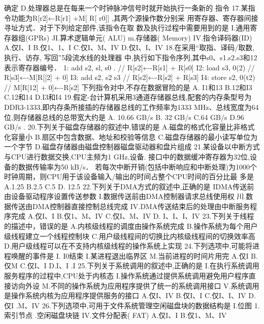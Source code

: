 确定
D.处理器总是在每来一个时钟脉冲信号时就开始执行一条新的
指令
17.某指令功能为R[r2]←R[r1] +M[ R[ r0]] ,其两个源操作数分别采
用寄存器、寄存器间接寻址方式．对于下列给定部件,该指令在取
数及执行过程中需要用到的是
I.通用寄存器组(GPRs)
JI.算术逻辑单元( ALU)
m.存储器( Memory)
IV.指令译码器(ID)
A.仅I、I
B.仅1、1、I
C.仅I、M、IV
D.仅I、I、IV
18.在采用“取指、译码/取数, 执行、访存, 写回”5段流水线的处理器
中,执行如下指令序列,其中s0、s1.s2.s3和12表示寄存器编号．
1: add s2, sl, s0
. // R[s2]←-R[s1] + R[s0]
I2: load s3, 0(2)
// R[s3]←-M[R[[2] + 0]
I3: add s2, s2 s3
// R[s2]←-R[s2] + R[s3]
I4: store s2, 0(t2)
// M[R[12] + 0]←-R[s2]
下列指令对中,不存在数据冒险的是
A. I1和13
B.12和I3
C.12和14
D.I3和I4
19.假定-台计算机采用3通道存储器总线,配套的内存条型号为
DDR3-1333,即内存条所接插的存储器总线的工作频率为1333
MHz、总线宽度为64位,则存储器总线的总带宽大约是
A. 10.66 GB/s
B. 32 GB/s
C.64 GB/s
D.96 GB/s .
20.下列关于磁盘存储器的叙述中,错误的是
A.磁盘的格式化容量比非格式化容量小
B.扇区中包含数据、地址和校验等信息
C.磁盘存储器的最小读写单位为一个字节
D.磁盘存储器由磁盘控制器磁盘驱动器和盘片组成
21.某设备以中断方式与CPU进行数据交换,CPU主频为1 GHz,设备.
接口中的数据缓冲寄存器为32位,设备的数据传输率为50 kB/s．
若每次中断开销(包括中断响应和中断处理)为1000个时钟周期，则CPU用于该设备输入/输出的时间占整个CPU时间的百分比最
多是
A.1.25%
B.2.5%
C.5%
D. 12.5%
22.下列关于DMA方式的叙述中,正确的是
IDMA传送前由设备驱动程序设置传送参数
I.数据传送前由DMA控制器请求总线使用权
川.数据传送由DMA控制器直接控制总线完成
IV.DMA传送结束后的处理由中断服务程序完成
A.仅I、I
B.仅1、M、IV
C.仅I、M、IV
D. I、I、I、IV
23.下列关于线程的描述中，错误的是
A.内核级线程的调度由操作系统完成
B.操作系统为每个用户级线程建立一个线程控制块
C.用户级线程间的切换比内核级线程间的切换效率高
D.用户级线程可以在不支持内核级线程的操作系统上实现
24.下列选项中,可能将进程唤醒的事件是
I. I0结束
I.某进程退出临界区
M.当前进程的时间片用完
A.仅I
B.仅M
C.仅I、I
D.I、I .I
25.下列关于系统调用的叙述中,正确的是
I.在执行系统调用服务程序的过程中,CPU处于内核态
I.操作系统通过提供系统调用避免用户程序直接访向外设
M.不同的操作系统为应用程序提供了统一的系统调用接口
V.系统调用是操作系统内核为应用程序提供服务的接口
A.仅I、IV
B.仅I、I
C.仅I、I、IV
D.仅I .M、IV
26.下列选项中,可用于文件系统管理空闲磁盘块的数据结构是
I.位图
1.索引节点
.空闲磁盘块链
IV.文件分配表( FAT)
A.仅I、I
B.仅1、M、IV

